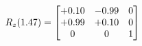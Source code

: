\documentclass[preview]{standalone}
\begin{document}
\begin{align*}
\special{dvisvgm:raw <g id='unique000'>}R_{z}(1.47) = \begin{bmatrix}+0.10 & -0.99 & 0 \\+0.99 & +0.10 & 0 \\0 & 0 & 1\end{bmatrix}\special{dvisvgm:raw </g>}
\end{align*}
\end{document}
